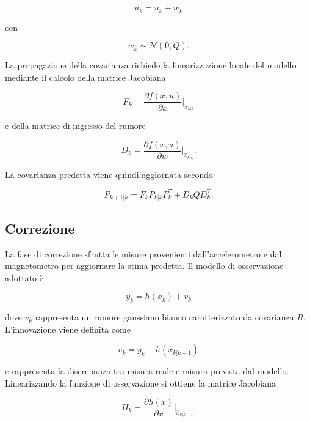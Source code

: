 \documentclass[12pt,a4paper]{article}
\begin{document}
\begin{equation}
u_k = \bar{u}_k + w_k
\end{equation}

con

\begin{equation}
w_k \sim \mathcal{N}(0,Q).
\end{equation}

La propagazione della covarianza richiede la linearizzazione locale del modello mediante il calcolo della matrice Jacobiana

\begin{equation}
F_k = \frac{\partial f(x,u)}{\partial x} \Bigg|_{\hat{x}_{k|k}}
\end{equation}

e della matrice di ingresso del rumore

\begin{equation}
D_k = \frac{\partial f(x,u)}{\partial w} \Bigg|_{\hat{x}_{k|k}}.
\end{equation}

La covarianza predetta viene quindi aggiornata secondo

\begin{equation}
P_{k+1|k} = F_k P_{k|k} F_k^T + D_k Q D_k^T.
\end{equation}


\subsection{Correzione}
La fase di correzione sfrutta le misure provenienti dall'accelerometro e dal magnetometro per aggiornare la stima predetta.
Il modello di osservazione adottato è

\begin{equation}
y_k = h(x_k) + v_k
\end{equation}

dove $v_k$ rappresenta un rumore gaussiano bianco caratterizzato da covarianza $R$.
L'innovazione viene definita come

\begin{equation}
e_k = y_k - h(\hat{x}_{k|k-1})
\end{equation}

e rappresenta la discrepanza tra misura reale e misura prevista dal modello.
Linearizzando la funzione di osservazione si ottiene la matrice Jacobiana

\begin{equation}
H_k = \frac{\partial h(x)}{\partial x} \Bigg|_{\hat{x}_{k|k-1}}.
\end{equation}
\end{document}
